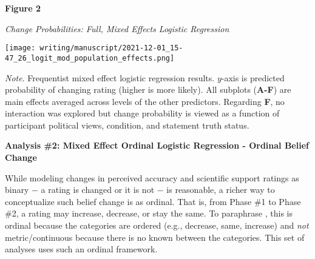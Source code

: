 \documentclass[12pt]{article}  %
\begin{document}





\newpage

\doublespacing

\textbf{Figure 2}

\textit{Change Probabilities: Full, Mixed Effects Logistic Regression}

\vspace{0.5cm}

\hspace{-1.5cm}\texttt{[image: writing/manuscript/2021-12-01\_15-47\_26\_logit\_mod\_population\_effects.png]}

\singlespacing
\noindent\textit{Note}. Frequentist mixed effect logistic regression results. $y$-axis is predicted probability of changing rating (higher is more likely). All subplots (\textbf{A-F}) are main effects averaged across levels of the other predictors. Regarding \textbf{F}, no interaction was explored but change probability is viewed as a function of participant political views, condition, and statement truth status.
\newpage


\doublespacing

\noindent\textbf{Analysis \#2: Mixed Effect Ordinal Logistic Regression - Ordinal Belief Change}

While modeling changes in perceived accuracy and scientific support ratings as binary $-$ a rating is changed or it is not $-$ is reasonable, a richer way to conceptualize such belief change is as ordinal. That is, from Phase \#1 to Phase \#2, a rating may increase, decrease, or stay the same. To paraphrase \textcite{burkner_ordinal_2019}, this is ordinal because the categories are ordered (e.g., decrease, same, increase) and \textit{not} metric/continuous because there is no known  between the categories. This set of analyses uses such an ordinal framework.
\end{document}
